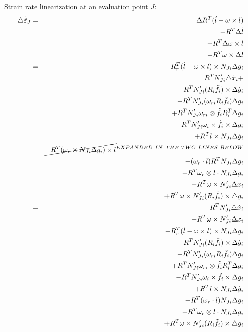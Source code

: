 Strain rate linearization at an evaluation point $J$:
\begin{eqnarray*}
\triangle\dot{\tilde{\varepsilon}}_{J} & = & \Delta R^{T}(\dot{l}-\omega\times l)\\
 &  & +R^{T}\Delta\dot{l}\\
 &  & -R^{T}\Delta\omega\times l\\
 &  & -R^{T}\omega\times\Delta l\\
 & = & R_{r}^{T}(\dot{l}-\omega\times l)\times N_{Ji}\Delta g_{i}\\
 &  & R^{T}N_{Ji}'\triangle\dot{x}_{i}+\\
 &  & -R^{T}N_{Ji}'(R_{i}\tilde{f}_{i})\times\Delta\dot{g}_{i}\\
 &  & -R^{T}N_{Ji}'(\omega_{ri}R_{i}\tilde{f}_{i})\Delta g_{i}\\
 &  & +R^{T}N_{Ji}'\omega_{ri}\otimes\tilde{f}_{i}R_{i}^{T}\Delta g_{i}\\
 &  & -R^{T}N_{Ji}'\omega_{i}\times\tilde{f}_{i}\times\Delta g_{i}\\
 &  & +R^{T}l\times N_{Ji}\Delta\dot{g}_{i}\\
 &  & \cancel{+R^{T}(\omega_{r}\times N_{Ji}\Delta g_{i})\times l}^{EXPANDED\ IN\ THE\ TWO\ LINES\ BELOW}\\
 &  & +(\omega_{r}\cdot l)R^{T}N_{Ji}\Delta g_{i}\\
 &  & -R^{T}\omega_{r}\otimes l\cdot N_{Ji}\Delta g_{i}\\
 &  & -R^{T}\omega\times N'_{Ji}\Delta x_{i}\\
 &  & +R^{T}\omega\times N'_{Ji}(R_{i}\tilde{f_{i}})\times\triangle g_{i}\\
 & = & R^{T}N_{Ji}'\triangle\dot{x}_{i}\\
 &  & -R^{T}\omega\times N'_{Ji}\Delta x_{i}\\
 &  & +R_{r}^{T}(\dot{l}-\omega\times l)\times N_{Ji}\Delta g_{i}\\
 &  & -R^{T}N_{Ji}'(R_{i}\tilde{f}_{i})\times\Delta\dot{g}_{i}\\
 &  & -R^{T}N_{Ji}'(\omega_{ri}R_{i}\tilde{f}_{i})\Delta g_{i}\\
 &  & +R^{T}N_{Ji}'\omega_{ri}\otimes\tilde{f}_{i}R_{i}^{T}\Delta g_{i}\\
 &  & -R^{T}N_{Ji}'\omega_{i}\times\tilde{f}_{i}\times\Delta g_{i}\\
 &  & +R^{T}l\times N_{Ji}\Delta\dot{g}_{i}\\
 &  & +R^{T}(\omega_{r}\cdot l)N_{Ji}\Delta g_{i}\\
 &  & -R^{T}\omega_{r}\otimes l\cdot N_{Ji}\Delta g_{i}\\
 &  & +R^{T}\omega\times N'_{Ji}(R_{i}\tilde{f_{i}})\times\triangle g_{i}
\end{eqnarray*}

